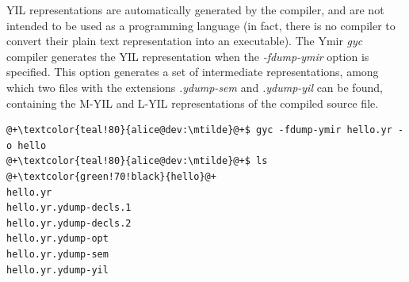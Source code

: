 YIL representations are automatically generated by the compiler, and are not
intended to be used as a programming language (in fact, there is no compiler to
convert their plain text representation into an executable). The
Ymir \textit{gyc} compiler generates the YIL representation when
the \textit{-fdump-ymir} option is specified. This option generates a set of
intermediate representations, among which two files with the
extensions \textit{.ydump-sem} and \textit{.ydump-yil} can be found, containing
the M-YIL and L-YIL representations of the compiled source file.

\begin{lstlisting}[style=bashVerb, escapechar=@+]
@+\textcolor{teal!80}{alice@dev:\mtilde}@+$ gyc -fdump-ymir hello.yr -o hello
@+\textcolor{teal!80}{alice@dev:\mtilde}@+$ ls
@+\textcolor{green!70!black}{hello}@+
hello.yr
hello.yr.ydump-decls.1
hello.yr.ydump-decls.2
hello.yr.ydump-opt
hello.yr.ydump-sem
hello.yr.ydump-yil
\end{lstlisting}

\vfill
\pagebreak
